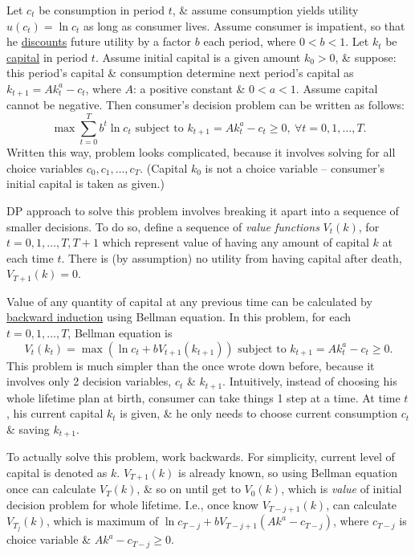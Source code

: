 \documentclass{article}
\begin{document}
\begin{enumerate}
\begin{itemize}
		Let $c_t$ be consumption in period $t$, \& assume consumption yields utility $u(c_t) = \ln c_t$ as long as consumer lives. Assume consumer is impatient, so that he \href{https://en.wikipedia.org/wiki/Discounting}{discounts} future utility by a factor $b$ each period, where $0 < b < 1$. Let $k_t$ be \href{https://en.wikipedia.org/wiki/Capital_(economics)}{capital} in period $t$. Assume initial capital is a given amount $k_0 > 0$, \& suppose: this period's capital \& consumption determine next period's capital as $k_{t+1} = Ak_t^a - c_t$, where $A$: a positive constant \& $0 < a < 1$. Assume capital cannot be negative. Then consumer's decision problem can be written as follows:
		\begin{equation*}
			\max\sum_{t=0}^T b^t\ln c_t\mbox{ subject to } k_{t+1} = Ak_t^a - c_t\ge0,\ \forall t = 0,1,\ldots,T.
		\end{equation*}
		Written this way, problem looks complicated, because it involves solving for all choice variables $c_0,c_1,\ldots,c_T$. (Capital $k_0$ is not a choice variable -- consumer's initial capital is taken as given.)

		DP approach to solve this problem involves breaking it apart into a sequence of smaller decisions. To do so, define a sequence of {\it value functions} $V_t(k)$, for $t = 0,1,\ldots,T,T+1$ which represent value of having any amount of capital $k$ at each time $t$. There is (by assumption) no utility from having capital after death, $V_{T+1}(k) = 0$.

		Value of any quantity of capital at any previous time can be calculated by \href{https://en.wikipedia.org/wiki/Backward_induction}{backward induction} using Bellman equation. In this problem, for each $t = 0,1,\ldots,T$, Bellman equation is
		\begin{equation*}
			V_t(k_t) = \max(\ln c_t + bV_{t+1}(k_{t+1}))\mbox{ subject to } k_{t+1} = Ak_t^a - c_t\ge0.
		\end{equation*}
		This problem is much simpler than the once wrote down before, because it involves only 2 decision variables, $c_t$ \& $k_{t+1}$. Intuitively, instead of choosing his whole lifetime plan at birth, consumer can take things 1 step at a time. At time $t$, his current capital $k_t$ is given, \& he only needs to choose current consumption $c_t$ \& saving $k_{t+1}$.

		To actually solve this problem, work backwards. For simplicity, current level of capital is denoted as $k$. $V_{T+1}(k)$ is already known, so using Bellman equation once can calculate $V_T(k)$, \& so on until get to $V_0(k)$, which is {\it value} of initial decision problem for whole lifetime. I.e., once know $V_{T-j+1}(k)$, can calculate $V_{T_j}(k)$, which is maximum of $\ln c_{T-j} + bV_{T-j+1}(Ak^a - c_{T-j})$, where $c_{T-j}$ is choice variable \& $Ak^a - c_{T-j}\ge0$.


\end{itemize}
\end{enumerate}
\end{document}
